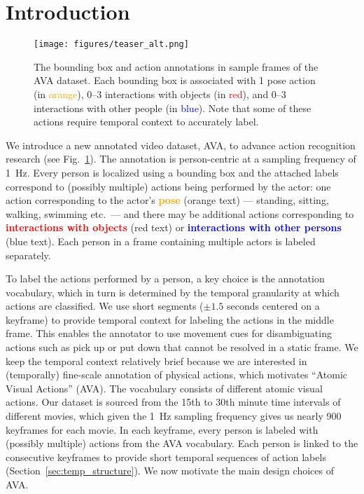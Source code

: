 \documentclass[10pt,twocolumn,letterpaper]{article}
\begin{document}
\vspace{-2em}
\section{Introduction}
\label{sec:introduction}


\begin{figure}[t]
\texttt{[image: figures/teaser\_alt.png]}
\caption{The bounding box and action annotations in sample frames of the AVA dataset. Each bounding box is associated with 1 pose action (in \textcolor{orange}{orange}), 0--3 interactions with objects (in \textcolor{red}{red}), and 0--3 interactions with other people (in \textcolor{blue}{blue}). Note that some of these actions require temporal context to accurately label.
\label{fig:teaser}
}
\vspace{-1em}
\end{figure}

We introduce a new annotated video dataset, AVA, to advance action recognition research (see Fig.~\ref{fig:teaser}). The annotation is person-centric at a sampling frequency of 1~Hz. Every person is localized using a bounding box and the attached labels correspond to (possibly multiple) actions being performed by the actor: one action corresponding to the actor's \textbf{\textcolor{orange}{pose}} (orange text) --- standing, sitting, walking, swimming etc.\ --- and there may be additional actions corresponding to \textbf{\textcolor{red}{interactions with objects}} (red text) or \textbf{\textcolor{blue}{interactions with other persons}} (blue text). Each person in a frame containing multiple actors is labeled separately.

To label the actions performed by a person, a key choice is the annotation vocabulary, which in turn is determined by the temporal granularity at which actions are classified. We use short segments ($\pm 1.5$ seconds centered on a keyframe) to provide temporal context for labeling the actions in the middle frame. This enables the annotator to use movement cues for disambiguating actions such as pick up or put down that cannot be resolved in a static frame. We keep the temporal context relatively brief because we are interested in (temporally) fine-scale  annotation of physical actions, which  motivates ``Atomic Visual Actions'' (AVA). The vocabulary consists of \numClasses{} different atomic visual actions. Our dataset is sourced from the 15th to 30th minute time intervals of \numMovies{} different movies, which given the 1~Hz sampling frequency gives us nearly 900 keyframes for each movie.  In each keyframe, every person is labeled with (possibly multiple) actions from the AVA vocabulary. Each person is linked to the consecutive keyframes to provide short temporal sequences of action labels (Section~\ref{sec:temp_structure}). We now motivate the main design choices of AVA.
\end{document}
